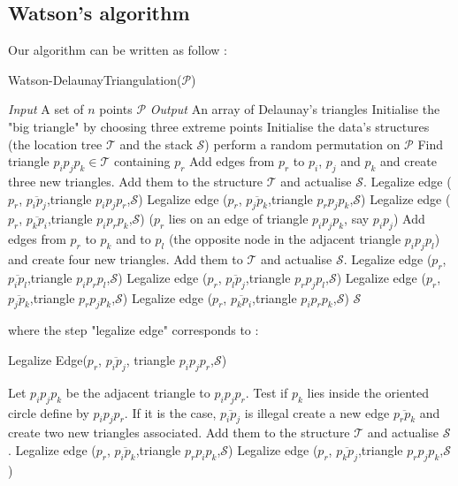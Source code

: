 \subsection*{Watson's algorithm}
Our algorithm can be written as follow :  
\begin{algorithm}[h!]
\caption{Watson-DelaunayTriangulation($\mathcal{P}$)}\label{Delaunay}
\begin{algorithmic}[1]
\State \textit{Input} A set of $n$ points $\mathcal{P}$
\State \textit{Output} An array of Delaunay's triangles
\State Initialise the "big triangle" by choosing three extreme points 
\State Initialise the data's structures (the location tree $\mathcal{T}$ and the stack $\mathcal{S}$)
\State perform a random permutation on $\mathcal{P}$
\State Find triangle $p_ip_jp_k \in \mathcal{T}$ containing $p_r$
\State Add edges from $p_r$ to $p_i$, $p_j$ and $p_k$ and create three new triangles. Add them to the structure $\mathcal{T}$ and actualise $\mathcal{S}$.
\State Legalize edge ($p_r$, $\overline{p_ip_j}$,triangle $p_ip_jp_r$,$\mathcal{S}$)
\State Legalize edge ($p_r$, $\overline{p_jp_k}$,triangle $p_rp_jp_k$,$\mathcal{S}$)
\State Legalize edge ($p_r$, $\overline{p_kp_i}$,triangle $p_ip_rp_k$,$\mathcal{S}$)
\Else ($p_r$ lies on an edge of triangle $p_ip_jp_k$, say $p_ip_j$)
\State Add edges from $p_r$ to $p_k$ and to $p_l$ (the opposite node in the adjacent triangle $p_ip_jp_l$) and create four new triangles. Add them to $\mathcal{T}$ and actualise $\mathcal{S}$.
\State Legalize edge ($p_r$, $\overline{p_ip_l}$,triangle $p_ip_rp_l$,$\mathcal{S}$)
\State Legalize edge ($p_r$, $\overline{p_lp_j}$,triangle $p_rp_jp_l$,$\mathcal{S}$)
\State Legalize edge ($p_r$, $\overline{p_jp_k}$,triangle $p_rp_jp_k$,$\mathcal{S}$)
\State Legalize edge ($p_r$, $\overline{p_kp_i}$,triangle $p_ip_rp_k$,$\mathcal{S}$)
\EndIf
\EndFor
\Return $\mathcal{S}$
\end{algorithmic}
\end{algorithm}

where the step "legalize edge" corresponds to : 
\begin{algorithm}[h!]
\caption{Legalize Edge($p_r$, $\overline{p_ip_j}$, triangle $p_ip_jp_r$,$\mathcal{S}$)} \label{legalizeEdge}
\begin{algorithmic}[1]
\State Let $p_ip_jp_k$ be the adjacent triangle to $p_ip_jp_r$. Test if $p_k$ lies inside the oriented circle define by $p_ip_jp_r$. If it is the case, $\overline{p_ip_j}$ is illegal 
\State create a new edge $\overline{p_rp_k}$ and create two new triangles associated. Add them to the structure $\mathcal{T}$ and actualise $\mathcal{S}$.
\State Legalize edge ($p_r$, $\overline{p_ip_k}$,triangle $p_rp_ip_k$,$\mathcal{S}$)
\State Legalize edge ($p_r$, $\overline{p_kp_j}$,triangle $p_rp_jp_k$,$\mathcal{S}$)
\EndIf
\end{algorithmic}
\end{algorithm}

